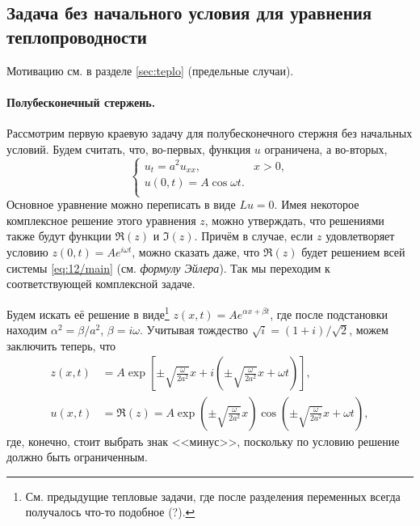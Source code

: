 \subsection{Задача без начального условия для уравнения теплопроводности}
Мотивацию см. в разделе \ref{sec:teplo} (предельные случаи). 
\paragraph{Полубесконечный стержень.} Рассмотрим первую
краевую задачу для полубесконечного стержня без начальных условий. Будем
считать, что, во-первых, функция $ u $ ограничена, а во-вторых,  
\begin{equation}
  \label{eq:12/main}
  \begin{cases}
    u_t = a^2u_{xx}, & x>0,\\
    u(0, t) = A\cos\omega t.\\
  \end{cases}
\end{equation}
Основное уравнение можно переписать в виде $ Lu = 0  $. Имея некоторое комплексное
решение этого уравнения $ z $, можно утверждать, что решениями также будут функции $ \Re(z) $
и $ \Im(z) $. Причём в случае, если $ z $ удовлетворяет условию $ z(0, t) =
Ae^{i\omega t} $, можно сказать даже, что $ \Re(z) $ будет решением всей системы
\eqref{eq:12/main} (см. \emph{формулу Эйлера}). Так мы переходим к соответствующей комплексной задаче.

Будем искать её решение в виде\footnote{См. предыдущие тепловые задачи, где после
разделения переменных всегда получалось что-то подобное (?).} $ z(x, t) = Ae^{\alpha x + \beta t} $, где после
подстановки находим $ \alpha^2 = \beta/a^2 $, $ \beta = i\omega $. Учитывая
тождество $ \sqrt i = (1+i)/\sqrt 2 $, можем заключить теперь, что 
\begin{align*}
  z(x, t) &= A\exp \left[ \pm \sqrt{ \frac{\omega}{2a^2}} x + i \left( \pm
  \sqrt{\frac{\omega}{2a^2}}x + \omega t \right)  \right],\\
      u(x, t) &= \Re(z) =  A\exp \left( \pm \sqrt{ \frac{\omega}{2a^2}} x\right)
      \cos \left( \pm
  \sqrt{\frac{\omega}{2a^2}}x + \omega t \right),
\end{align*}
где, конечно, стоит выбрать знак <<минус>>, поскольку по условию решение должно
быть ограниченным.

